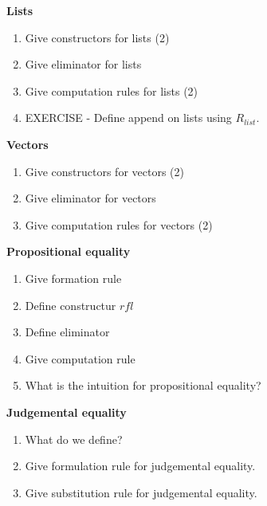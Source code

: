 \documentclass[fleqn]{article}
\begin{document}
\textbf{Lists}
\begin{enumerate}
    \item Give constructors for lists (2)
    \item Give eliminator for lists
    \item Give computation rules for lists (2)
    \item EXERCISE - Define append on lists using $R_{list}$.
\end{enumerate}

\textbf{Vectors}
\begin{enumerate}
    \item Give constructors for vectors (2)
    \item Give eliminator for vectors
    \item Give computation rules for vectors (2)
\end{enumerate}

\textbf{Propositional equality}
\begin{enumerate}
    \item Give formation rule
    \item Define constructur $rfl$
    \item Define eliminator
    \item Give computation rule
    \item What is the intuition for propositional equality?
\end{enumerate}

\textbf{Judgemental equality}
\begin{enumerate}
    \item What do we define?
    \item Give formulation rule for judgemental equality.
    \item Give substitution rule for judgemental equality.
\end{enumerate}
\end{document}
